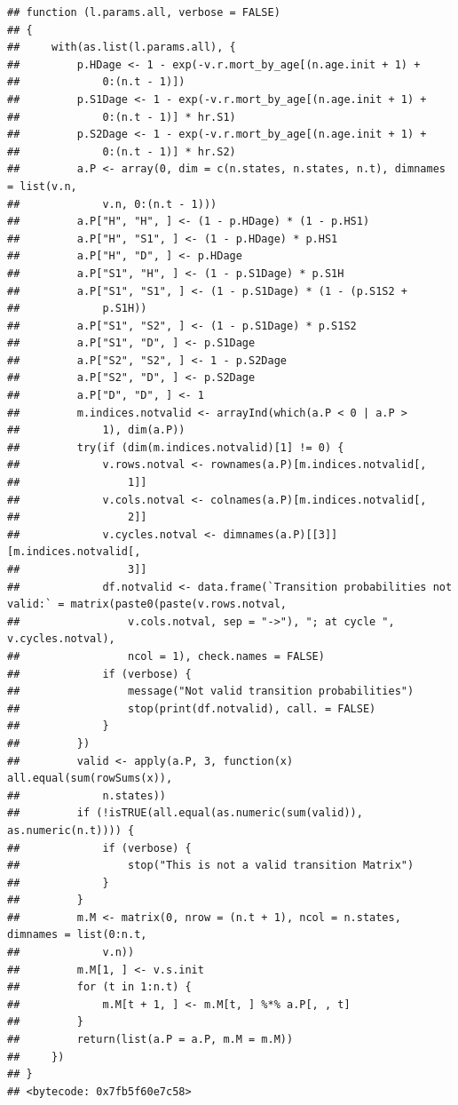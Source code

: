 \documentclass[]{article}
\begin{document}
\begin{verbatim}
## function (l.params.all, verbose = FALSE) 
## {
##     with(as.list(l.params.all), {
##         p.HDage <- 1 - exp(-v.r.mort_by_age[(n.age.init + 1) + 
##             0:(n.t - 1)])
##         p.S1Dage <- 1 - exp(-v.r.mort_by_age[(n.age.init + 1) + 
##             0:(n.t - 1)] * hr.S1)
##         p.S2Dage <- 1 - exp(-v.r.mort_by_age[(n.age.init + 1) + 
##             0:(n.t - 1)] * hr.S2)
##         a.P <- array(0, dim = c(n.states, n.states, n.t), dimnames = list(v.n, 
##             v.n, 0:(n.t - 1)))
##         a.P["H", "H", ] <- (1 - p.HDage) * (1 - p.HS1)
##         a.P["H", "S1", ] <- (1 - p.HDage) * p.HS1
##         a.P["H", "D", ] <- p.HDage
##         a.P["S1", "H", ] <- (1 - p.S1Dage) * p.S1H
##         a.P["S1", "S1", ] <- (1 - p.S1Dage) * (1 - (p.S1S2 + 
##             p.S1H))
##         a.P["S1", "S2", ] <- (1 - p.S1Dage) * p.S1S2
##         a.P["S1", "D", ] <- p.S1Dage
##         a.P["S2", "S2", ] <- 1 - p.S2Dage
##         a.P["S2", "D", ] <- p.S2Dage
##         a.P["D", "D", ] <- 1
##         m.indices.notvalid <- arrayInd(which(a.P < 0 | a.P > 
##             1), dim(a.P))
##         try(if (dim(m.indices.notvalid)[1] != 0) {
##             v.rows.notval <- rownames(a.P)[m.indices.notvalid[, 
##                 1]]
##             v.cols.notval <- colnames(a.P)[m.indices.notvalid[, 
##                 2]]
##             v.cycles.notval <- dimnames(a.P)[[3]][m.indices.notvalid[, 
##                 3]]
##             df.notvalid <- data.frame(`Transition probabilities not valid:` = matrix(paste0(paste(v.rows.notval, 
##                 v.cols.notval, sep = "->"), "; at cycle ", v.cycles.notval), 
##                 ncol = 1), check.names = FALSE)
##             if (verbose) {
##                 message("Not valid transition probabilities")
##                 stop(print(df.notvalid), call. = FALSE)
##             }
##         })
##         valid <- apply(a.P, 3, function(x) all.equal(sum(rowSums(x)), 
##             n.states))
##         if (!isTRUE(all.equal(as.numeric(sum(valid)), as.numeric(n.t)))) {
##             if (verbose) {
##                 stop("This is not a valid transition Matrix")
##             }
##         }
##         m.M <- matrix(0, nrow = (n.t + 1), ncol = n.states, dimnames = list(0:n.t, 
##             v.n))
##         m.M[1, ] <- v.s.init
##         for (t in 1:n.t) {
##             m.M[t + 1, ] <- m.M[t, ] %*% a.P[, , t]
##         }
##         return(list(a.P = a.P, m.M = m.M))
##     })
## }
## <bytecode: 0x7fb5f60e7c58>
\end{verbatim}
\end{document}
